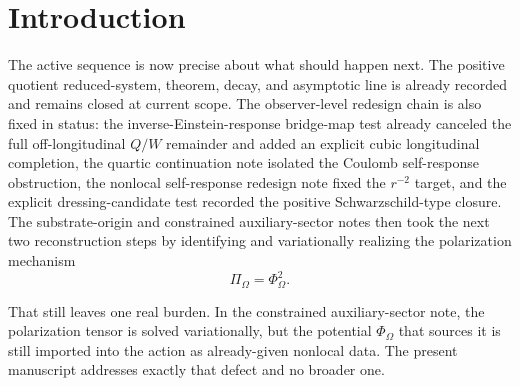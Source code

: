 \documentclass[11pt]{article}
\newcommand{\FlowPot}{\Phi_\Omega}
\newcommand{\BalanceField}{\Pi_\Omega}
\newcommand{\SigmaIER}{\Sigma^{\mathrm{IER}}}
\begin{document}
\begin{abstract}
Because the source sector is elliptic and nonpropagating on each local experiential slice, and because it enters the bridge metric only through the quartic combination \(\BalanceField=\FlowPot^2\), it does not reopen the lower-order quotient PDE line. Matter-free activity survives because the same reduced Hamiltonian charge can be nonzero on the rotational matter-free regime; off-longitudinal \(Q/W\) cancellation and explicit cubic longitudinal completion survive because \(\SigmaIER\) is unchanged; and quartic Coulomb self-response absorption survives because the eliminated observer tensor is the same explicit dressed candidate already tested positively.

This note is still not a completed microphysical derivation of Einsteinian gravity from substrate first principles. Its narrower positive result is the one the active sequence now required: the Hamiltonian-charge potential \(\FlowPot\) is internalized into an enlarged action by explicit substrate charge variables, its Coulomb tail is derived from a source equation, and the same \(r^{-2}\) dressed bridge output together with the same gain package is preserved.
\end{abstract}

\section{Introduction}

The active sequence is now precise about what should happen next. The positive quotient reduced-system, theorem, decay, and asymptotic line is already recorded and remains closed at current scope. The observer-level redesign chain is also fixed in status: the inverse-Einstein-response bridge-map test already canceled the full off-longitudinal \(Q/W\) remainder and added an explicit cubic longitudinal completion, the quartic continuation note isolated the Coulomb self-response obstruction, the nonlocal self-response redesign note fixed the \(r^{-2}\) target, and the explicit dressing-candidate test recorded the positive Schwarzschild-type closure. The substrate-origin and constrained auxiliary-sector notes then took the next two reconstruction steps by identifying and variationally realizing the polarization mechanism
\[
\BalanceField=\FlowPot^2.
\]

That still leaves one real burden. In the constrained auxiliary-sector note, the polarization tensor is solved variationally, but the potential \(\FlowPot\) that sources it is still imported into the action as already-given nonlocal data. The present manuscript addresses exactly that defect and no broader one.
\end{document}
